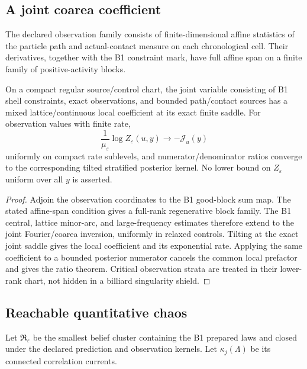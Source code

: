 \subsection{A joint coarea coefficient}

The declared observation family consists of finite-dimensional affine
statistics of the particle path and actual-contact measure on each
chronological cell.  Their derivatives, together with the B1 constraint mark,
have full affine span on a finite family of positive-activity blocks.

\begin{theorem}
\label{thm:r10-c1-coefficient}
On a compact regular source/control chart, the joint variable consisting of
B1 shell constraints, exact observations, and bounded path/contact sources
has a mixed lattice/continuous local coefficient at its exact finite saddle.
For observation values with finite rate,
\[
 \frac1{\mu_\varepsilon}\log Z_\varepsilon(u,y)
 \longrightarrow-\mathcal J_u(y)
\]
uniformly on compact rate sublevels, and numerator/denominator ratios converge
to the corresponding tilted stratified posterior kernel.  No lower bound on
\(Z_\varepsilon\) uniform over all \(y\) is asserted.
\end{theorem}

\begin{proof}
Adjoin the observation coordinates to the B1 good-block sum map.  The stated
affine-span condition gives a full-rank regenerative block family.  The B1
central, lattice minor-arc, and large-frequency estimates therefore extend to
the joint Fourier/coarea inversion, uniformly in relaxed controls.  Tilting at
the exact joint saddle gives the local coefficient and its exponential rate.
Applying the same coefficient to a bounded posterior numerator cancels the
common local prefactor and gives the ratio theorem.  Critical observation
strata are treated in their lower-rank chart, not hidden in a billiard
singularity shield.
\end{proof}

\subsection{Reachable quantitative chaos}

Let \(\mathfrak R_\varepsilon\) be the smallest belief cluster containing the
B1 prepared laws and closed under the declared prediction and observation
kernels.  Let \(\kappa_j(\Lambda)\) be its connected correlation currents.

